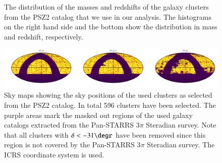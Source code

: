 \documentclass[iop, apjl, twocolappendix, numberedappendix]{emulateapj}
\begin{document}
\begin{figure}
\caption{The distribution of the masses and redshifts of the galaxy clusters
from the PSZ2 catalog that we use in our analysis. The histograms on the right
hand side and the bottom show the distribution in mass and redshift,
respectively.}
   \label{fig:planck_summary}
\end{figure}

\begin{figure}
    \includegraphics[width=\textwidth]{skymaps.pdf}
\caption{Sky maps showing the sky positions of the used clusters as
selected from the PSZ2 catalog. In total 596 clusters have been
selected. The purple areas mark the masked out regions of the used
galaxy catalogs extracted from the Pan-STARRS 3$\pi$ Steradian
survey. Note that all clusters with
$\delta<-31\degr$ have been removed since this region is not covered
by the Pan-STARRS 3$\pi$ Steradian survey. The ICRS coordinate
system is used.}
   \label{fig:skymaps}
\end{figure}
\end{document}
